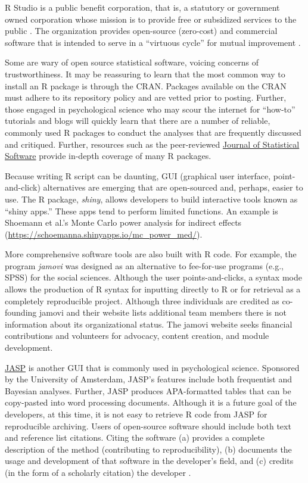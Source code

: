 \documentclass[
  11pt,
]{book}
\begin{document}
R Studio is a public benefit corporation, that is, a statutory or government owned corporation whose mission is to provide free or subsidized services to the public \citep{noauthor_rstudio_2022}. The organization provides open-source (zero-cost) and commercial software that is intended to serve in a ``virtuous cycle'' for mutual improvement \citep{noauthor_rstudio_2022}.

Some are wary of open source statistical software, voicing concerns of trustworthiness. It may be reassuring to learn that the most common way to install an R package is through the CRAN. Packages available on the CRAN must adhere to its repository policy and are vetted prior to posting. Further, those engaged in psychological science who may scour the internet for ``how-to'' tutorials and blogs will quickly learn that there are a number of reliable, commonly used R packages to conduct the analyses that are frequently discussed and critiqued. Further, resources such as the peer-reviewed \href{https://www.jstatsoft.org/index}{Journal of Statistical Software} provide in-depth coverage of many R packages.

Because writing R script can be daunting, GUI (graphical user interface, point-and-click) alternatives are emerging that are open-sourced and, perhaps, easier to use. The R package, \emph{shiny}, allows developers to build interactive tools known as ``shiny apps.'' These apps tend to perform limited functions. An example is Shoemann et al.'s \citeyearpar{shoemann_determining_2017} Monte Carlo power analysis for indirect effects (\url{https://schoemanna.shinyapps.io/mc_power_med/}).

More comprehensive software tools are also built with R code. For example, the program \emph{jamovi} \citep{the_jamovi_project_about_2021} was designed as an alternative to fee-for-use programs (e.g., SPSS) for the social sciences. Although the user points-and-clicks, a syntax mode allows the production of R syntax for inputting directly to R or for retrieval as a completely reproducible project. Although three individuals are credited as co-founding jamovi and their website lists additional team members \citep{the_jamovi_project_about_2021} there is not information about its organizational status. The jamovi website seeks financial contributions and volunteers for advocacy, content creation, and module development.

\href{https://jasp-stats.org/}{JASP} \citep[``just another statistics program'',][]{jasp_team_jasp_2022} is another GUI that is commonly used in psychological science. Sponsored by the University of Amsterdam, JASP's features include both frequentist and Bayesian analyses. Further, JASP produces APA-formatted tables that can be copy-pasted into word processing documents. Although it is a future goal of the developers, at this time, it is not easy to retrieve R code from JASP for reproducible archiving. Users of open-source software should include both text and reference list citations. Citing the software (a) provides a complete description of the method (contributing to reproducibility), (b) documents the usage and development of that software in the developer's field, and (c) credits (in the form of a scholarly citation) the developer \citep{smith_software_2016}.
\end{document}
